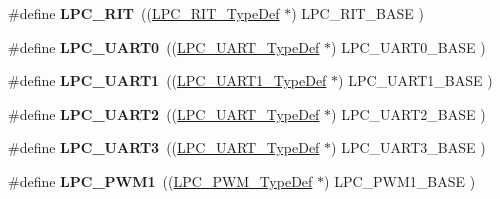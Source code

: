 \begin{DoxyCompactItemize}
\item 
\hypertarget{group___l_p_c17xx___system_gafdf2cd2149b37f8021a1c19191f8ec50}{\#define {\bfseries \-L\-P\-C\-\_\-\-R\-I\-T}~((\hyperlink{struct_l_p_c___r_i_t___type_def}{\-L\-P\-C\-\_\-\-R\-I\-T\-\_\-\-Type\-Def}       $\ast$) \-L\-P\-C\-\_\-\-R\-I\-T\-\_\-\-B\-A\-S\-E      )}\label{group___l_p_c17xx___system_gafdf2cd2149b37f8021a1c19191f8ec50}

\item 
\hypertarget{group___l_p_c17xx___system_ga6ba29f0f9b8af2f72e303533185bcc82}{\#define {\bfseries \-L\-P\-C\-\_\-\-U\-A\-R\-T0}~((\hyperlink{struct_l_p_c___u_a_r_t___type_def}{\-L\-P\-C\-\_\-\-U\-A\-R\-T\-\_\-\-Type\-Def}      $\ast$) \-L\-P\-C\-\_\-\-U\-A\-R\-T0\-\_\-\-B\-A\-S\-E    )}\label{group___l_p_c17xx___system_ga6ba29f0f9b8af2f72e303533185bcc82}

\item 
\hypertarget{group___l_p_c17xx___system_ga83ea0dab4dcb7411c2e1de20050a4d2d}{\#define {\bfseries \-L\-P\-C\-\_\-\-U\-A\-R\-T1}~((\hyperlink{struct_l_p_c___u_a_r_t1___type_def}{\-L\-P\-C\-\_\-\-U\-A\-R\-T1\-\_\-\-Type\-Def}     $\ast$) \-L\-P\-C\-\_\-\-U\-A\-R\-T1\-\_\-\-B\-A\-S\-E    )}\label{group___l_p_c17xx___system_ga83ea0dab4dcb7411c2e1de20050a4d2d}

\item 
\hypertarget{group___l_p_c17xx___system_gac8badf231948fc9216d416c71a34e924}{\#define {\bfseries \-L\-P\-C\-\_\-\-U\-A\-R\-T2}~((\hyperlink{struct_l_p_c___u_a_r_t___type_def}{\-L\-P\-C\-\_\-\-U\-A\-R\-T\-\_\-\-Type\-Def}      $\ast$) \-L\-P\-C\-\_\-\-U\-A\-R\-T2\-\_\-\-B\-A\-S\-E    )}\label{group___l_p_c17xx___system_gac8badf231948fc9216d416c71a34e924}

\item 
\hypertarget{group___l_p_c17xx___system_ga61c2bf57d66b50108cdec6878f9e8ee5}{\#define {\bfseries \-L\-P\-C\-\_\-\-U\-A\-R\-T3}~((\hyperlink{struct_l_p_c___u_a_r_t___type_def}{\-L\-P\-C\-\_\-\-U\-A\-R\-T\-\_\-\-Type\-Def}      $\ast$) \-L\-P\-C\-\_\-\-U\-A\-R\-T3\-\_\-\-B\-A\-S\-E    )}\label{group___l_p_c17xx___system_ga61c2bf57d66b50108cdec6878f9e8ee5}

\item 
\hypertarget{group___l_p_c17xx___system_ga6e400c5c011db85f452eb2fb4a1ee7c2}{\#define {\bfseries \-L\-P\-C\-\_\-\-P\-W\-M1}~((\hyperlink{struct_l_p_c___p_w_m___type_def}{\-L\-P\-C\-\_\-\-P\-W\-M\-\_\-\-Type\-Def}       $\ast$) \-L\-P\-C\-\_\-\-P\-W\-M1\-\_\-\-B\-A\-S\-E     )}\label{group___l_p_c17xx___system_ga6e400c5c011db85f452eb2fb4a1ee7c2}


\end{DoxyCompactItemize}
